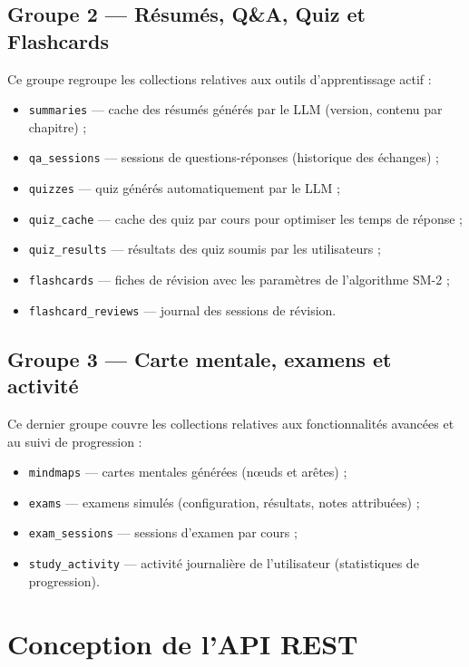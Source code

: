 \subsection{Groupe 2 — Résumés, Q\&A, Quiz et Flashcards}

Ce groupe regroupe les collections relatives aux outils d'apprentissage actif :

\begin{itemize}
  \item \texttt{summaries} — cache des résumés générés par le LLM (version, contenu par chapitre) ;
  \item \texttt{qa\_sessions} — sessions de questions-réponses (historique des échanges) ;
  \item \texttt{quizzes} — quiz générés automatiquement par le LLM ;
  \item \texttt{quiz\_cache} — cache des quiz par cours pour optimiser les temps de réponse ;
  \item \texttt{quiz\_results} — résultats des quiz soumis par les utilisateurs ;
  \item \texttt{flashcards} — fiches de révision avec les paramètres de l'algorithme SM-2 ;
  \item \texttt{flashcard\_reviews} — journal des sessions de révision.
\end{itemize}

\subsection{Groupe 3 — Carte mentale, examens et activité}

Ce dernier groupe couvre les collections relatives aux fonctionnalités avancées et au suivi de progression :

\begin{itemize}
  \item \texttt{mindmaps} — cartes mentales générées (nœuds et arêtes) ;
  \item \texttt{exams} — examens simulés (configuration, résultats, notes attribuées) ;
  \item \texttt{exam\_sessions} — sessions d'examen par cours ;
  \item \texttt{study\_activity} — activité journalière de l'utilisateur (statistiques de progression).
\end{itemize}

\section{Conception de l'API REST}

